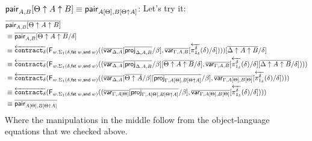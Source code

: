 \documentclass[10pt]{article}
\theoremstyle{definition}
\newcommand\dsd[1]{\ensuremath{\mathsf{#1}}}
\newcommand{\app}[2]{\ensuremath{#1 \: #2}}
\newcommand{\fst}[1]{\app{\dsd{fst}}{#1}}
\newcommand{\snd}[1]{\app{\dsd{snd}}{#1}}
\newcommand{\rewrite}[2]{\overleftarrow{#1}(#2)}
\newcommand\FIs[2]{\ensuremath{\mathsf{F}_{#1}{(#2)}}}
\begin{document}
\begin{enumerate}[style = multiline, labelwidth = 80pt]
\item[{$\mathsf{pair}_{A, B}[\Theta \uparrow A \uparrow B] \equiv \mathsf{pair}_{A[\Theta], B[\Theta \uparrow A]}$}:]
Let's try it:
\begin{align*}
&\upstairs{\qpair{A, B}[\Theta \uparrow A \uparrow B]} \\
&\equiv \upstairs{\qpair{A, B}}[\upstairs{\Theta \uparrow A \uparrow B}/\delta] \\
&\equiv \rewrite{\contract{\delta}}{\FIs{w. \Sigma_1(\delta,\fst w, \snd w)}{(\upstairs{\qvar{\Delta, A}}[\upstairs{\proj{\Delta, A, B}}/\beta], \upstairs{\qvar{\Gamma, A, B}}[\rewrite{\pi^\delta_{1_\delta}}{\delta}/\delta])}}[\upstairs{\Delta \uparrow A \uparrow B}/\delta] \\
&\equiv \rewrite{\contract{\delta}}{\FIs{w. \Sigma_1(\delta,\fst w, \snd w)}{(\upstairs{\qvar{\Delta, A}}[\upstairs{\proj{\Delta, A, B}}/\beta][\upstairs{\Theta \uparrow A \uparrow B}/\delta], \upstairs{\qvar{\Gamma, A, B}}[\rewrite{\pi^\delta_{1_\delta}}{\delta}/\delta][\upstairs{\Delta \uparrow A \uparrow B}/\delta])}} \\
&\equiv \rewrite{\contract{\delta}}{\FIs{w. \Sigma_1(\delta,\fst w, \snd w)}{(\upstairs{\qvar{\Delta, A}}[\upstairs{\Theta \uparrow A}/\beta][\upstairs{\proj{\Gamma, A[\Theta], B[\Theta \uparrow A]}}/\beta], \upstairs{\qvar{\Gamma, A[\Theta], B[\Theta]}}[\rewrite{\pi^\delta_{1_\delta}}{\delta}/\delta])}} \\
&\equiv \rewrite{\contract{\delta}}{\FIs{w. \Sigma_1(\delta,\fst w, \snd w)}{(\upstairs{\qvar{\Gamma, A[\Theta]}}[\upstairs{\proj{\Gamma, A[\Theta], B[\Theta \uparrow A]}}/\beta], \upstairs{\qvar{\Gamma, A[\Theta], B[\Theta]}}[\rewrite{\pi^\delta_{1_\delta}}{\delta}/\delta])}} \\
&\equiv \upstairs{\qpair{A[\Theta], B[\Theta \uparrow A]}}
\end{align*}
Where the manipulations in the middle follow from the object-language equations that we checked above.


\end{enumerate}
\end{document}
